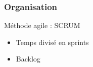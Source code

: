 \begin{frame}
\frametitle{Organisation}
Méthode agile : SCRUM
\begin{itemize}
\item Temps divisé en sprints
\item Backlog
\end{itemize}
\end{frame}

